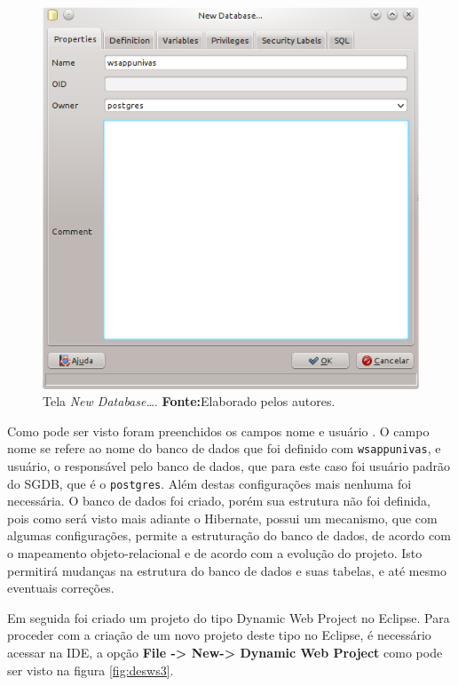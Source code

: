 	\begin{figure}[h!]
		\centerline{\includegraphics[scale=1]{./imagens/2_q_metodologico/4_procedimentos_resultados/43_webservice/432_desenvolvimento/desws2.png}}
		\caption[Tela \textit{New Database\ldots}]{Tela \textit{New Database\ldots}.
			\textbf{Fonte:}Elaborado pelos autores.}
		\label{fig:desws2}
	\end{figure}
	\pagebreak

	\par Como pode ser visto foram preenchidos os campos nome e usuário . O campo
nome se refere ao nome do banco de dados que foi definido com
\texttt{wsappunivas}, e usuário, o responsável pelo banco de dados, que para
este caso foi usuário padrão do SGDB, que é o \texttt{postgres}. Além destas
configurações mais nenhuma foi necessária. O banco de dados foi criado, porém
sua estrutura não foi definida, pois como será visto mais adiante o Hibernate,
possui um mecanismo, que com algumas configurações, permite a estruturação do
banco de dados, de acordo com o mapeamento objeto-relacional e de acordo com a
evolução do projeto. Isto permitirá mudanças na estrutura do banco de dados e
suas tabelas, e até mesmo eventuais correções.
	
	\par Em seguida foi criado um projeto do tipo Dynamic Web Project no
Eclipse. Para proceder com a criação de um novo projeto deste tipo no Eclipse, é
necessário acessar na IDE, a opção \textbf{File -> New-> Dynamic Web Project}
como pode ser visto na figura \ref{fig:desws3}.

